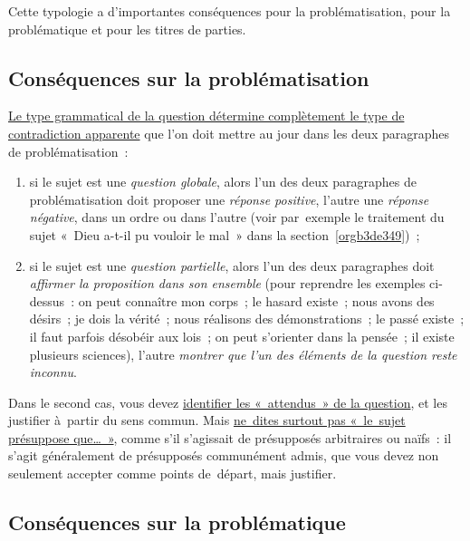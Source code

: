 \documentclass[a4paper,12pt]{report}
\begin{document}
Cette typologie a d'importantes conséquences pour la problématisation,
pour la problématique et pour les titres de parties.


\subsection{Conséquences sur la problématisation}
\label{sec:org2643ac9}

\uline{Le type grammatical de la question détermine complètement le type de
contradiction apparente} que l'on doit mettre au jour dans les deux
paragraphes de problématisation :

\begin{enumerate}
\item si le sujet est une \emph{question globale}, alors l'un des deux
paragraphes de problématisation doit proposer une \emph{réponse positive},
l'autre une \emph{réponse négative}, dans un ordre ou dans l'autre (voir
par exemple le traitement du sujet « Dieu a-t-il pu vouloir le mal »
dans la section \ref{orgb3de349}) ;

\item si le sujet est une \emph{question partielle}, alors l'un des deux
paragraphes doit \emph{affirmer la proposition dans son ensemble} (pour
reprendre les exemples ci-dessus : on peut connaître mon corps ; le
hasard existe ; nous avons des désirs ; je dois la vérité ; nous
réalisons des démonstrations ; le passé existe ; il faut parfois
désobéir aux lois ; on peut s'orienter dans la pensée ; il existe
plusieurs sciences), l'autre \emph{montrer que l'un des éléments de la
question reste inconnu}.
\end{enumerate}

Dans le second cas, vous devez \uline{identifier les « attendus » de la
question}, et les justifier à partir du sens commun. Mais \uline{ne dites
surtout pas « le sujet présuppose que\ldots{} »}, comme s'il s'agissait de
présupposés arbitraires ou naïfs : il s'agit généralement de présupposés
communément admis, que vous devez non seulement accepter comme points
de départ, mais justifier.


\subsection{Conséquences sur la problématique}
\label{sec:org706af46}
\end{document}
